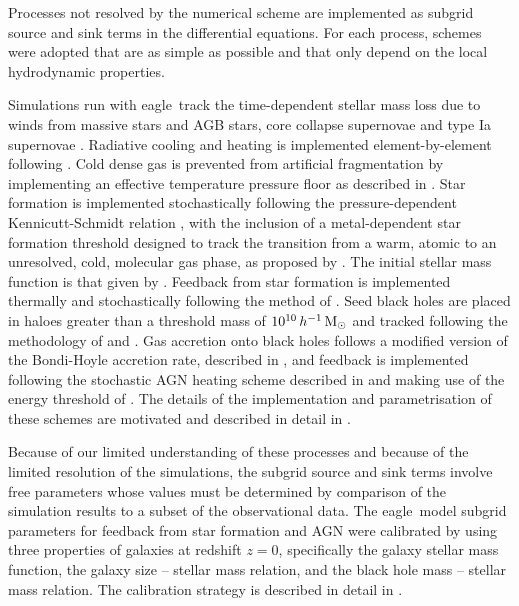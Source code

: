 \documentclass[10pt, a4paper]{article}
\newcommand{\eagle}{{\sc eagle}}
\newcommand{\Msun}{{\hbox{${\rm M}_\odot$}}}
\begin{document}
Processes not resolved by the numerical scheme are implemented as subgrid source and sink terms in the differential equations. For each process, schemes were adopted that are as simple as possible and that only depend on the local
hydrodynamic properties.

Simulations run with \eagle\ track the time-dependent stellar mass loss due to winds from massive stars and AGB stars, core collapse supernovae and type Ia supernovae \cite{2009MNRAS.399..574W}. Radiative cooling and heating is implemented element-by-element following \cite{2009MNRAS.393...99W}. Cold dense gas is prevented from artificial fragmentation by implementing an effective temperature pressure floor as described in \cite{2008MNRAS.383.1210S}. Star formation is implemented stochastically following the pressure-dependent Kennicutt-Schmidt relation \cite{2008MNRAS.383.1210S}, with the inclusion of a metal-dependent star formation threshold designed to track the transition from a warm, atomic to an unresolved, cold, molecular gas phase, as proposed by \cite{2004ApJ...609..667S}. The initial stellar mass function is that given by \cite{2003PASP..115..763C}. Feedback from star formation is implemented thermally and stochastically following the method of \cite{2012MNRAS.426..140D}. Seed black holes are placed in haloes greater than a threshold mass of $10^{10}\,h^{-1}\,\Msun$ and tracked following the methodology of \cite{2005MNRAS.361..776S} and \cite{2009MNRAS.398...53B}. Gas accretion onto black holes follows a modified version of the Bondi-Hoyle accretion rate, described in \cite[][but modified as described in \citealp{2015MNRAS.446..521S}]{2015MNRAS.454.1038R}, and feedback is implemented following the stochastic AGN heating scheme described in \cite{2015MNRAS.446..521S} and making use of the energy threshold of \cite{2009MNRAS.398...53B}. The details of the implementation and parametrisation of these schemes are motivated and described in detail in \cite{2015MNRAS.446..521S}.

Because of our limited understanding of these processes and because of the limited resolution of the simulations, the subgrid source and sink terms involve free parameters whose values must be determined by comparison of the simulation results to a subset of the observational data. The \eagle\ model subgrid parameters for feedback from star formation and AGN were calibrated by using three properties of galaxies at redshift $z=0$, specifically the galaxy stellar mass function, the galaxy size -- stellar mass relation, and the black hole mass -- stellar mass relation. The calibration strategy is described in detail in \cite{2015MNRAS.450.1937C}.
\end{document}
